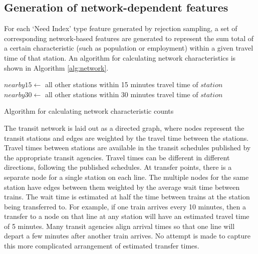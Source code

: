 \documentclass[11pt]{article}
\begin{document}
\subsection{Generation of network-dependent features}\label{sec:net}

For each `Need Index' type feature generated by rejection sampling, a set of corresponding network-based features are generated to represent the sum total of a certain characteristic (such as population or employment) within a given travel time of that station. An algorithm for calculating network characteristics is shown in Algorithm \ref{alg:network}. 

\begin{algorithm}
\begin{algorithmic}
	\State$nearby15 \gets$ all other stations within 15 minutes travel time of $station$
	\State$nearby30 \gets$ all other stations within 30 minutes travel time of $station$
		\EndFor
		\EndFor
	\EndFor
\EndFor
\end{algorithmic}\caption{Algorithm for calculating network characteristic counts}\label{alg:network}
\end{algorithm}

The transit network is laid out as a directed graph, where nodes represent the transit stations and edges are weighted by the travel time between the stations. Travel times between stations are available in the transit schedules published by the appropriate transit agencies. Travel times can be different in different directions, following the published schedules. At transfer points, there is a separate node for a single station on each line. The multiple nodes for the same station have edges between them weighted by the average wait time between trains. The wait time is estimated at half the time between trains at the station being transferred to. For example, if one train arrives every 10 minutes, then a transfer to a node on that line at any station will have an estimated travel time of 5 minutes. Many transit agencies align arrival times so that one line will depart a few minutes after another train arrives. No attempt is made to capture this more complicated arrangement of estimated transfer times. 
\end{document}

